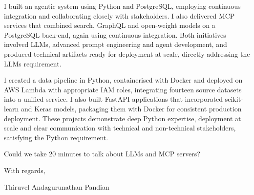 \documentclass[11pt,a4paper]{article}
\begin{document}
I built an agentic system using Python and PostgreSQL, employing continuous integration and collaborating closely with stakeholders. I also delivered MCP services that combined search, GraphQL and open-weight models on a PostgreSQL back-end, again using continuous integration. Both initiatives involved LLMs, advanced prompt engineering and agent development, and produced technical artifacts ready for deployment at scale, directly addressing the LLMs requirement.

I created a data pipeline in Python, containerised with Docker and deployed on AWS Lambda with appropriate IAM roles, integrating fourteen source datasets into a unified service. I also built FastAPI applications that incorporated scikit-learn and Keras models, packaging them with Docker for consistent production deployment. These projects demonstrate deep Python expertise, deployment at scale and clear communication with technical and non-technical stakeholders, satisfying the Python requirement.

Could we take 20 minutes to talk about LLMs and MCP servers?

\vspace{0.5cm}

With regards,

Thiruvel Andagurunathan Pandian
\end{document}
